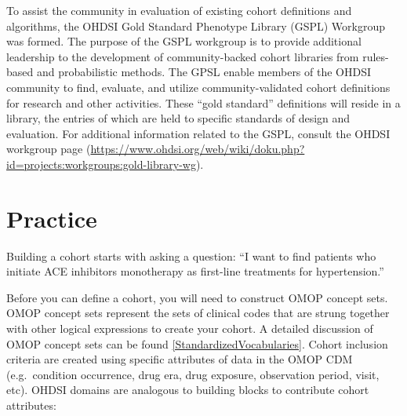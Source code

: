 \documentclass[11pt]{book}
\theoremstyle{definition}
\theoremstyle{definition}
\theoremstyle{definition}
\theoremstyle{remark}
\begin{document}
To assist the community in evaluation of existing cohort definitions and algorithms, the OHDSI Gold Standard Phenotype Library (GSPL) Workgroup was formed. The purpose of the GSPL workgroup is to provide additional leadership to the development of community-backed cohort libraries from rules-based and probabilistic methods. The GPSL enable members of the OHDSI community to find, evaluate, and utilize community-validated cohort definitions for research and other activities. These ``gold standard'' definitions will reside in a library, the entries of which are held to specific standards of design and evaluation. For additional information related to the GSPL, consult the OHDSI workgroup page (\url{https://www.ohdsi.org/web/wiki/doku.php?id=projects:workgroups:gold-library-wg}).

\hypertarget{practice}{%
\section{Practice}\label{practice}}

Building a cohort starts with asking a question: ``I want to find patients who initiate ACE inhibitors monotherapy as first-line treatments for hypertension.''

Before you can define a cohort, you will need to construct OMOP concept sets. OMOP concept sets represent the sets of clinical codes that are strung together with other logical expressions to create your cohort. A detailed discussion of OMOP concept sets can be found \ref{StandardizedVocabularies}. Cohort inclusion criteria are created using specific attributes of data in the OMOP CDM (e.g.~condition occurrence, drug era, drug exposure, observation period, visit, etc). OHDSI domains are analogous to building blocks to contribute cohort attributes:
\end{document}
